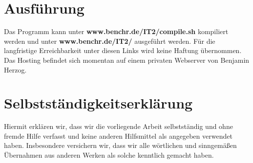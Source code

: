 \documentclass[a4paper,oneside,titlepage,12pt]{article}
\begin{document}
\clearpage

\section{Ausführung}
Das Programm kann unter \textbf{www.benchr.de/IT2/compile.sh} kompiliert werden und unter \textbf{www.benchr.de/IT2/} ausgeführt werden. Für die langfristige Erreichbarkeit unter diesen Links wird keine Haftung übernommen. Das Hosting befindet sich momentan auf einem privaten Webserver von Benjamin Herzog.

\section{Selbstständigkeitserklärung}
Hiermit erklären wir, dass wir die vorliegende Arbeit selbstständig und ohne fremde Hilfe verfasst und keine anderen Hilfsmittel als angegeben verwendet haben. Insbesondere versichern wir, dass wir alle wörtlichen und sinngemäßen Übernahmen aus anderen Werken als solche kenntlich gemacht haben.

\clearpage
\end{document}
